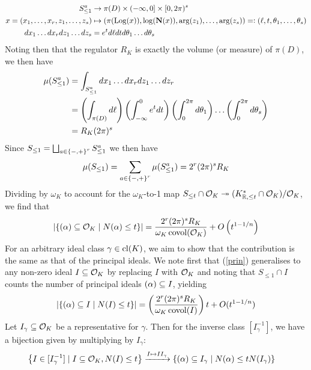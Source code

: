 \documentclass[11pt]{report}
\begin{document}
\begin{align*}
    S_{\leq 1}^a &\to \pi(D) \times (-\infty, 0] \times [0, 2\pi)^s \\
    x = (x_1, \ldots, x_r, z_1, \ldots, z_s) &\mapsto (\pi(\operatorname{Log}(x)), \log(\operatorname{\mathbf{N}}(x)), \arg(z_1), \ldots, \arg(z_s)) =\vcentcolon (\ell, t, \theta_1, \ldots, \theta_s) \\
    dx_1 \ldots dx_r dz_1 \ldots dz_s &= e^t d\ell dt d\theta_1 \ldots d\theta_s
\end{align*}
Noting then that the regulator $R_K$ is exactly the volume (or measure) of $\pi(D)$, we then have
\begin{align*}
    \mu(S_{\leq 1}^a) &= \int_{S_{\leq 1}^a} dx_1 \ldots dx_r dz_1 \ldots dz_r \\
    &= \left(  \int_{\pi(D)} d\ell  \right)\left(  \int_{-\infty}^0 e^t dt  \right)\left(  \int_0^{2\pi} d\theta_1  \right) \ldots \left(  \int_0^{2\pi} d\theta_s  \right) \\
    &= R_K(2\pi)^s
\end{align*}
Since $S_{\leq 1} = \bigsqcup_{a \in \left\{  -, +  \right\}^r} S_{\leq 1}^a$ we then have
$$
    \mu(S_{\leq 1}) = \sum_{a \in \left\{  -, +  \right\}^r}\mu(S_{\leq 1}^a) = 2^r(2\pi)^sR_K
$$
Dividing by $\omega_K$ to account for the $\omega_K$-to-1 map $S_{\leq t} \cap \mathcal{O}_K \twoheadrightarrow (K_{\mathbb{R}, \leq t}^* \cap \mathcal{O}_K) / \mathcal{O}_K$, we find that
\begin{align}\label{prin}
    \left| \left\{  (\alpha) \subseteq \mathcal{O}_K \mid N(\alpha) \leq t  \right\} \right| = \frac{2^r(2\pi)^sR_K}{\omega_K\operatorname{covol}(\mathcal{O}_K)} + O\left(  t^{1 - 1/n}  \right)
\end{align}
For an arbitrary ideal class $\gamma \in \operatorname{cl}(K)$, we aim to show that the contribution is the same as that of the principal ideals. We note first that (\ref{prin}) generalises to any non-zero ideal $I \subseteq \mathcal{O}_K$ by replacing $I$ with $\mathcal{O}_K$ and noting that $S_{\leq 1} \cap I$ counts the number of principal ideals $(\alpha) \subseteq I$, yielding
\begin{align}
    \left| \left\{  (\alpha) \subseteq I \mid N(I) \leq t  \right\} \right| = \left(  \frac{2^r(2\pi)^sR_K}{\omega_K\operatorname{covol}(I)}  \right)t + O(t^{1 - 1/n})
\end{align}
Let $I_\gamma \subseteq \mathcal{O}_K$ be a representative for $\gamma$. Then for the inverse class $[I_\gamma^{-1}]$, we have a bijection given by multiplying by $I_\gamma$:
\begin{align*}
    \left\{  I \in [I_{\gamma}^{-1}] \mid I \subseteq \mathcal{O}_K, N(I) \leq t  \right\} &\xrightarrow{I \mapsto II_\gamma} \left\{  (\alpha) \subseteq I_\gamma \mid N(\alpha) \leq tN(I_\gamma)  \right\}
\end{align*}
\end{document}
